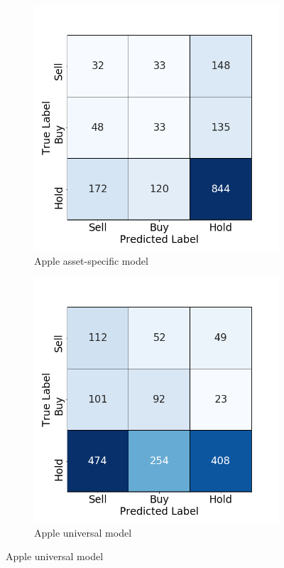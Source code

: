 \documentclass[12pt, a4paper]{article}
\begin{document}
\begin{figure}[H]
\begin{subfigure}{.5\textwidth}
  \centering
  \includegraphics[width=.75\linewidth]{images/CMs/CM_indiv_AAPL.png}  
  \caption{Apple asset-specific model}
  \label{fig:subAAPLI}
\end{subfigure}
\begin{subfigure}{.5\textwidth}
  \centering
  \includegraphics[width=.75\linewidth]{images/CMs/CM_univ_AAPL.png}  
  \caption{Apple universal model}
  \label{fig:subAAPLU}
\end{subfigure}


\end{figure}
\end{document}
